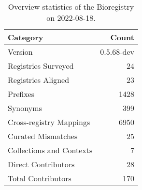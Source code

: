 \begin{table}
\centering
\caption{Overview statistics of the Bioregistry on 2022-08-18.}
\label{tab:bioregistry-summary}
\begin{tabular}{lr}
\toprule
                Category &      Count \\
\midrule
                 Version & 0.5.68-dev \\
     Registries Surveyed &         24 \\
      Registries Aligned &         23 \\
                Prefixes &       1428 \\
                Synonyms &        399 \\
 Cross-registry Mappings &       6950 \\
      Curated Mismatches &         25 \\
Collections and Contexts &          7 \\
     Direct Contributors &         28 \\
      Total Contributors &        170 \\
\bottomrule
\end{tabular}
\end{table}
